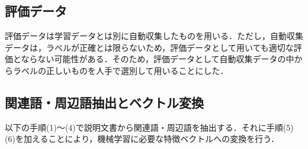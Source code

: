 \documentclass[japanese]{jnlp_1.4}
\begin{document}
\subsection{評価データ}

評価データは学習データとは別に自動収集したものを用いる．ただし，自動収集データは，ラベルが正確とは限らないため，評価データとして用いても適切な評価とならない可能性がある．そのため，評価データとして自動収集データの中からラベルの正しいものを人手で選別して用いることにした．


\subsection{関連語・周辺語抽出とベクトル変換}

以下の手順(1)〜(4)で説明文書から関連語・周辺語を抽出する．それに手順(5)(6)を加えることにより，機械学習に必要な特徴ベクトルへの変換を行う．
\end{document}
